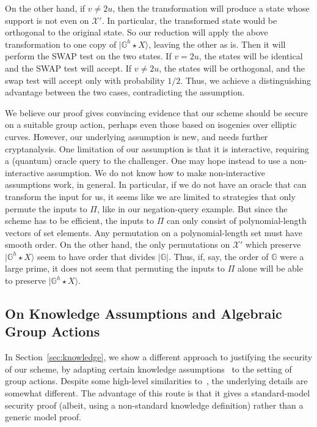 \documentclass{article}\usepackage[a4paper,margin=20mm]{geometry}
\numberwithin{theorem}{section}
\numberwithin{equation}{section}
\newcommand{\G}{\mathbb{G}}
\newcommand{\Xs}{{\mathcal{X}}}
\begin{document}
On the other hand, if $v\neq 2u$, then the transformation will produce a state whose support is not even on $\Xs'$. In particular, the transformed state would be orthogonal to the original state. So our reduction will apply the above transformation to one copy of $|\G^h\star X\rangle$, leaving the other as is. Then it will perform the SWAP test on the two states. If $v=2u$, the states will be identical and the SWAP test will accept. If $v\neq 2u$, the states will be orthogonal, and the swap test will accept only with probability $1/2$. Thus, we achieve a distinguishing advantage between the two cases, contradicting the assumption.

\medskip

We believe our proof gives convincing evidence that our scheme should be secure on a suitable group action, perhaps even those based on isogenies over elliptic curves. However, our underlying assumption is new, and needs further cryptanalysis. One limitation of our assumption is that it is interactive, requiring a (quantum) oracle query to the challenger. One may hope instead to use a non-interactive assumption. We do not know how to make non-interactive assumptions work, in general. In particular, if we do not have an oracle that can transform the input for us, it seems like we are limited to strategies that only permute the inputs to $\Pi$, like in our negation-query example. But since the scheme has to be efficient, the inputs to $\Pi$ can only consist of polynomial-length vectors of set elements. Any permutation on a polynomial-length set must have smooth order. On the other hand, the only permutations on $\Xs'$ which preserve $|\G^h\star X\rangle$ seem to have order that divides $|\G|$. Thus, if, say, the order of $\G$ were a large prime, it does not seem that permuting the inputs to $\Pi$ alone will be able to preserve $|\G^h\star X\rangle$.




\subsection{On Knowledge Assumptions and Algebraic Group Actions} 

In Section~\ref{sec:knowledge}, we show a different approach to justifying the security of our scheme, by adapting certain knowledge assumptions~\cite{EC:LiuMonZha23} to the setting of group actions. Despite some high-level similarities to~\cite{EC:LiuMonZha23}, the underlying details are somewhat different. The advantage of this route is that it gives a standard-model security proof (albeit, using a non-standard knowledge definition) rather than a generic model proof.
\end{document}
